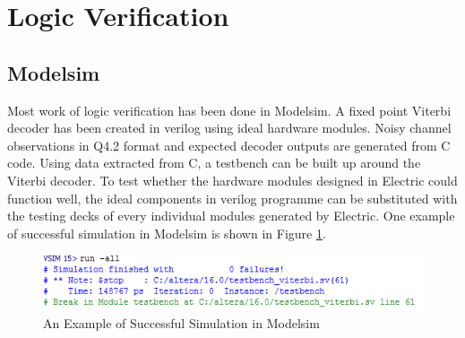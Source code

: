 \documentclass[conference]{IEEEtran}
\begin{document}


\section{Logic Verification}
\subsection{Modelsim}
Most work of logic verification has been done in Modelsim. A fixed point Viterbi decoder has been created in verilog using ideal hardware modules. Noisy channel observations in Q4.2 format and expected decoder outputs are generated from C code. Using data extracted from C, a testbench can be built up around the Viterbi decoder. To test whether the hardware modules designed in Electric could function well, the ideal components in verilog programme can be substituted with the testing decks of every individual modules generated by Electric. One example of successful simulation in Modelsim is shown in Figure \ref{fig:modelsim}.
\begin{figure}[h]
\centering
\includegraphics[scale=0.4]{decoder1_lay_sim}
\caption{An Example of Successful Simulation in Modelsim}
\label{fig:modelsim}
\end{figure}
\end{document}
